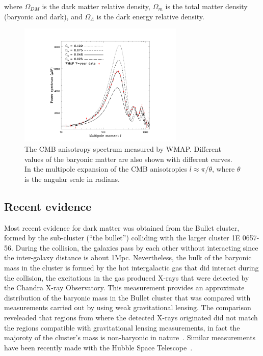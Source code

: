 where $\Omega_{DM}$ is the dark matter relative density, $\Omega_{m}$
is the total matter density (baryonic and dark), and
$\Omega_{\Lambda}$ is the dark energy relative density.
\begin{figure}
 \centering
\includegraphics[width=0.7\textwidth]{IntroFigures/CMB_Multipole.pdf}
\caption{The CMB anisotropy spectrum measured by WMAP. Different
  values of the baryonic matter are also shown with different
  curves. In the multipole expansion of the CMB anisotropies
  $l\approx\pi/\theta$, where $\theta$ is the angular scale in radians.\label{fig:CMBAnisotropies}}
\end{figure}
\subsection{Recent evidence}

Most recent evidence for dark matter was obtained from the Bullet
cluster, formed by the sub-cluster (``the bullet'') colliding with the
larger cluster 1E 0657-56. During the collision, the galaxies pass by
each other without interacting since the inter-galaxy distance is
about 1\unit{Mpc}. Nevertheless, the bulk of the baryonic mass in the cluster is
formed by the hot intergalactic gas that did interact during the
collision, the excitations in the gas produced X-rays that were
detected by the Chandra X-ray Observatory. This measurement provides
an approximate distribution of the baryonic mass in the Bullet cluster
that was compared with measurements carried out by using weak
gravitational lensing. The comparison reveleaded that regions from
where the detected X-rays originated did not match the regions
compatible with gravitational lensing measurements, in fact the
majoroty of the cluster's mass is non-baryonic in nature~\cite{bullet}. Similar
measurements have been recently made with the Hubble Space Telescope~\cite{RingDM}.

